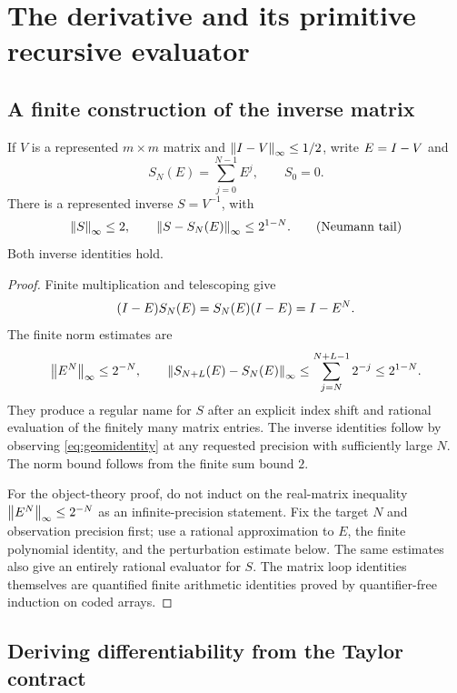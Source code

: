 \section{The derivative and its primitive recursive evaluator}
\label{sec:derivative}

\subsection{A finite construction of the inverse matrix}

\begin{lemma}\label{lem:neumann}
If \(V\) is a represented \(m\times m\) matrix and
\(\left\lVert I-V\right\rVert_\infty\le1/2\), write \(E=I-V\) and
\[
 S_N(E)=\sum_{j=0}^{N-1}E^j,\qquad S_0=0.
\]
There is a represented inverse \(S=V^{-1}\), with
\[
 \left\lVert S\right\rVert_\infty\le2,\qquad
 \left\lVert S-S_N(E)\right\rVert_\infty\le2^{1-N}.
 \tag{Neumann tail}
\]
Both inverse identities hold.
\end{lemma}

\begin{proof}
Finite multiplication and telescoping give
\begin{equation}\label{eq:geomidentity}
 (I-E)S_N(E)=S_N(E)(I-E)=I-E^N.
\end{equation}
The finite norm estimates are
\[
 \left\lVert E^N\right\rVert_\infty\le2^{-N},\qquad
 \left\lVert S_{N+L}(E)-S_N(E)\right\rVert_\infty
 \le\sum_{j=N}^{N+L-1}2^{-j}\le2^{1-N}.
\]
They produce a regular name for \(S\) after an explicit index
shift and rational evaluation of the finitely many matrix entries.
The inverse identities follow by observing \eqref{eq:geomidentity}
at any requested precision with sufficiently large \(N\).
The norm bound follows from the finite sum bound \(2\).

For the object-theory proof, do not induct on the real-matrix
inequality \(\left\lVert E^N\right\rVert_\infty\le2^{-N}\) as an infinite-precision
statement. Fix the target \(N\) and observation precision first;
use a rational approximation to \(E\), the finite polynomial
identity, and the perturbation estimate below. The same estimates
also give an entirely rational evaluator for \(S\). The matrix
loop identities themselves are quantified finite arithmetic
identities proved by quantifier-free induction on coded arrays.
\end{proof}

\subsection{Deriving differentiability from the Taylor contract}

